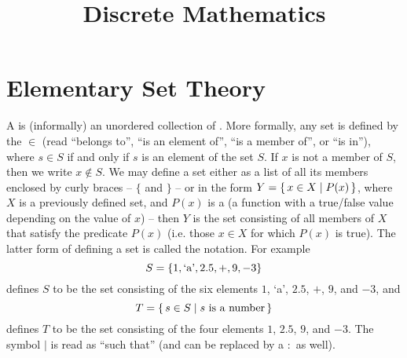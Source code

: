 
\title{\textbf{Discrete Mathematics}}

\date{}
\maketitle

\begingroup
\let\clearpage\relax
\tableofcontents
\endgroup

\clearpage

\renewcommand{\nomname}{List of Symbols}
\printnomenclature[10em]

\clearpage

\section{Elementary Set Theory}\label{sec:SetTheory}

A  is (informally) an unordered collection of . More formally, any set is defined by the  $\in$ (read ``belongs to'', ``is an element of'', ``is a member of'', or ``is in''), where $s \in S$ if and only if $s$ is an element of the set $S$. If $x$ is not a member of $S$, then we write $x \notin S$. We may define a set either as a list of all its members enclosed by curly braces -- $\{$ and $\}$ -- or in the form $Y = \qty{\, x \in X \mid P(x) \,}$, where $X$ is a previously defined set, and $P(x)$ is a  (a function with a true/false value depending on the value of $x$) -- then $Y$ is the set consisting of all members of $X$ that satisfy the predicate $P(x)$ (i.e. those $x \in X$ for which $P(x)$ is true). The latter form of defining a set is called the  notation. For example
\begin{equation*}
S = \qty{1, \text{`a'}, 2.5, +, 9, -3}
\end{equation*}
defines $S$ to be the set consisting of the six elements $1$, `a', $2.5$, $+$, $9$, and $-3$, and
\begin{equation*}
T = \qty{\, s \in S \mid s\ \text{is a number} \,}
\end{equation*}
defines $T$ to be the set consisting of the four elements $1$, $2.5$, $9$, and $-3$. The symbol {$|$} is read as ``such that'' (and can be replaced by a $:$ as well).

